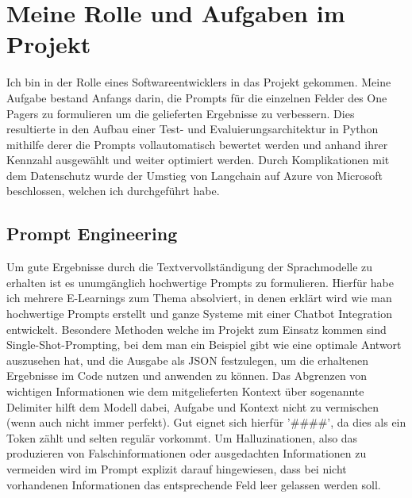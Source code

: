 \section{Meine Rolle und Aufgaben im Projekt}
Ich bin in der Rolle eines Softwareentwicklers in das Projekt gekommen. Meine Aufgabe bestand Anfangs darin, die Prompts
für die einzelnen Felder des One Pagers zu formulieren um die gelieferten Ergebnisse zu verbessern. Dies resultierte in
den Aufbau einer Test- und Evaluierungsarchitektur in Python mithilfe derer die Prompts vollautomatisch bewertet werden
und anhand ihrer Kennzahl ausgewählt und weiter optimiert werden. Durch Komplikationen mit dem Datenschutz wurde der
Umstieg von Langchain auf Azure von Microsoft beschlossen, welchen ich durchgeführt habe. 

\subsection{Prompt Engineering}
Um gute Ergebnisse durch die Textvervollständigung der Sprachmodelle zu erhalten ist es unumgänglich hochwertige Prompts
zu formulieren. Hierfür habe ich mehrere E-Learnings zum Thema \textcite{deeplearning.AI} absolviert, in denen erklärt wird wie
man hochwertige Prompts erstellt und ganze Systeme mit einer Chatbot Integration entwickelt. Besondere Methoden welche im
Projekt zum Einsatz kommen sind Single-Shot-Prompting, bei dem man ein Beispiel gibt wie eine optimale Antwort
auszusehen hat, und die Ausgabe als JSON festzulegen, um die erhaltenen Ergebnisse im Code nutzen und anwenden zu
können. Das Abgrenzen von wichtigen Informationen wie dem mitgelieferten Kontext über sogenannte Delimiter hilft dem
Modell dabei, Aufgabe und Kontext nicht zu vermischen (wenn auch nicht immer perfekt). Gut eignet sich hierfür
'\#\#\#\#', da dies als ein Token zählt und selten regulär vorkommt. Um Halluzinationen, also das produzieren von
Falschinformationen oder ausgedachten Informationen zu vermeiden wird im Prompt explizit darauf hingewiesen, dass bei
nicht vorhandenen Informationen das entsprechende Feld leer gelassen werden soll. 

